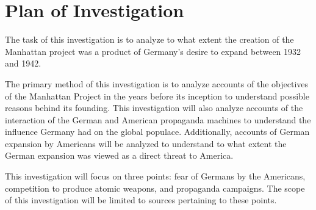 \documentclass[a4paper,12pt]{article}
\begin{document}
    
    

    \section{Plan of Investigation}

        The task of this investigation is to analyze to what extent the creation of the Manhattan
        project was a product of Germany's desire to expand between 1932 and 1942.

        The primary method of this investigation is to analyze accounts of the objectives of the
        Manhattan Project in the years before its inception to understand possible reasons behind
        its founding. This investigation will also analyze accounts of the interaction of the German
        and American propaganda machines to understand the influence Germany had on the global
        populace. Additionally, accounts of German expansion by Americans will be analyzed to
        understand to what extent the German expansion was viewed as a direct threat to America.

        This investigation will focus on three points: fear of Germans by the Americans, competition to
        produce atomic weapons, and propaganda campaigns. The scope of this investigation will be
        limited to sources pertaining to these points.


\end{document}
